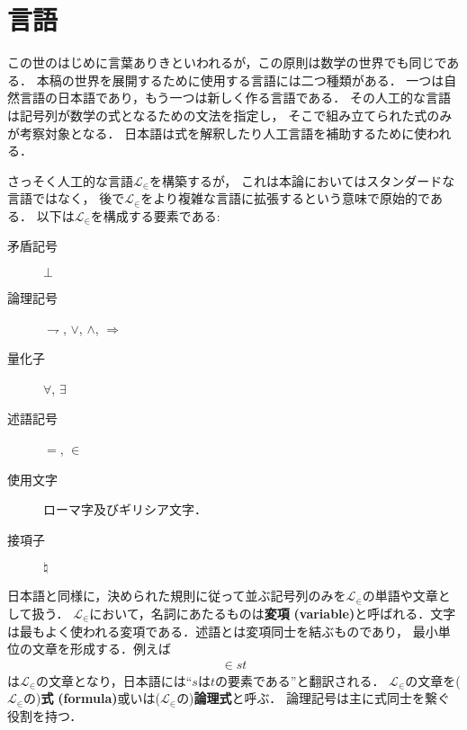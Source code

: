\chapter{言語}

	この世のはじめに言葉ありきといわれるが，この原則は数学の世界でも同じである．
	本稿の世界を展開するために使用する言語には二つ種類がある．
	一つは自然言語の日本語であり，もう一つは新しく作る言語である．
	その人工的な言語は記号列が数学の式となるための文法を指定し，
	そこで組み立てられた式のみが考察対象となる．
	日本語は式を解釈したり人工言語を補助するために使われる．
	
	さっそく人工的な言語$\mathcal{L}_{\in}$を構築するが，
	これは本論においてはスタンダードな言語ではなく，
	後で$\mathcal{L}_{\in}$をより複雑な言語に拡張するという意味で原始的である．
	以下は$\mathcal{L}_{\in}$を構成する要素である:
	\begin{description}
		\item[矛盾記号] $\bot$
		\item[論理記号] $\rightharpoondown$, $\vee$, $\wedge$, $\Longrightarrow$
		\item[量化子] $\forall$, $\exists$
		\item[述語記号] $=$, $\in$
		\item[使用文字] ローマ字及びギリシア文字．
		\item[接項子] $\natural$
	\end{description}
	
	日本語と同様に，決められた規則に従って並ぶ記号列のみを$\mathcal{L}_{\in}$の単語や文章として扱う．
	$\mathcal{L}_{\in}$において，名詞にあたるものは{\bf 変項}
	{\bf (variable)}と呼ばれる．文字は最もよく使われる変項である．述語とは変項同士を結ぶものであり，
	最小単位の文章を形成する．例えば
	\begin{align}
		\in st
	\end{align}
	は$\mathcal{L}_{\in}$の文章となり，日本語には``$s$は$t$の要素である''と翻訳される．
	$\mathcal{L}_{\in}$の文章を($\mathcal{L}_{\in}$の){\bf 式}
	{\bf (formula)}或いは($\mathcal{L}_{\in}$の){\bf 論理式}と呼ぶ．
	論理記号は主に式同士を繋ぐ役割を持つ．
	

